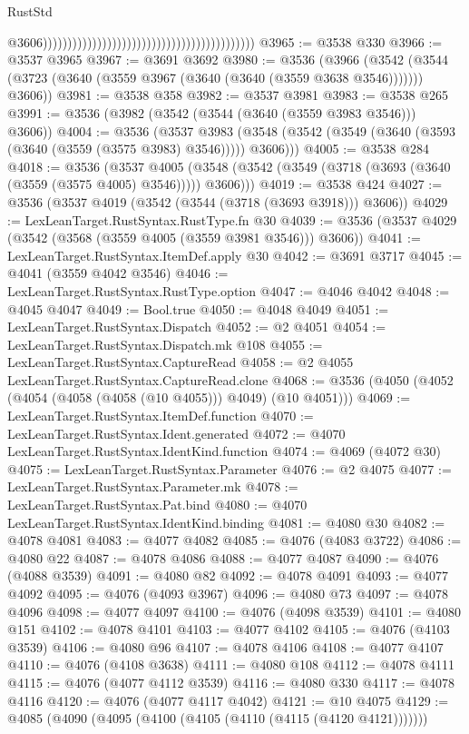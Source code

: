\begin{lexlean}{RustStd}
\begin{coremodule}
{\begin{coremodule}
{{{{{{{{{{{{{{{{{{{{{{{{{{{{{{{{{{{{{{{{{{{{{{{{{{                                                                                          @3606)))))))))))))))))))))))))))))))))))))))))))
@3965 := @3538 @330
@3966 := @3537 @3965
@3967 := @3691 @3692
@3980 := @3536
    (@3966 (@3542 (@3544 (@3723 (@3640 (@3559 @3967 (@3640 (@3640 (@3559 @3638 @3546))))))) @3606))
@3981 := @3538 @358
@3982 := @3537 @3981
@3983 := @3538 @265
@3991 := @3536 (@3982 (@3542 (@3544 (@3640 (@3559 @3983 @3546))) @3606))
@4004 := @3536
    (@3537 @3983 (@3548 (@3542 (@3549 (@3640 (@3593 (@3640 (@3559 (@3575 @3983) @3546))))) @3606)))
@4005 := @3538 @284
@4018 := @3536
    (@3537 @4005 (@3548 (@3542 (@3549 (@3718 (@3693 (@3640 (@3559 (@3575 @4005) @3546))))) @3606)))
@4019 := @3538 @424
@4027 := @3536 (@3537 @4019 (@3542 (@3544 (@3718 (@3693 @3918))) @3606))
@4029 := LexLeanTarget.RustSyntax.RustType.fn @30
@4039 := @3536 (@3537 @4029 (@3542 (@3568 (@3559 @4005 (@3559 @3981 @3546))) @3606))
@4041 := LexLeanTarget.RustSyntax.ItemDef.apply @30
@4042 := @3691 @3717
@4045 := @4041 (@3559 @4042 @3546)
@4046 := LexLeanTarget.RustSyntax.RustType.option
@4047 := @4046 @4042
@4048 := @4045 @4047
@4049 := Bool.true
@4050 := @4048 @4049
@4051 := LexLeanTarget.RustSyntax.Dispatch
@4052 := @2 @4051
@4054 := LexLeanTarget.RustSyntax.Dispatch.mk @108
@4055 := LexLeanTarget.RustSyntax.CaptureRead
@4058 := @2 @4055 LexLeanTarget.RustSyntax.CaptureRead.clone
@4068 := @3536 (@4050 (@4052 (@4054 (@4058 (@4058 (@10 @4055))) @4049) (@10 @4051)))
@4069 := LexLeanTarget.RustSyntax.ItemDef.function
@4070 := LexLeanTarget.RustSyntax.Ident.generated
@4072 := @4070 LexLeanTarget.RustSyntax.IdentKind.function
@4074 := @4069 (@4072 @30)
@4075 := LexLeanTarget.RustSyntax.Parameter
@4076 := @2 @4075
@4077 := LexLeanTarget.RustSyntax.Parameter.mk
@4078 := LexLeanTarget.RustSyntax.Pat.bind
@4080 := @4070 LexLeanTarget.RustSyntax.IdentKind.binding
@4081 := @4080 @30
@4082 := @4078 @4081
@4083 := @4077 @4082
@4085 := @4076 (@4083 @3722)
@4086 := @4080 @22
@4087 := @4078 @4086
@4088 := @4077 @4087
@4090 := @4076 (@4088 @3539)
@4091 := @4080 @82
@4092 := @4078 @4091
@4093 := @4077 @4092
@4095 := @4076 (@4093 @3967)
@4096 := @4080 @73
@4097 := @4078 @4096
@4098 := @4077 @4097
@4100 := @4076 (@4098 @3539)
@4101 := @4080 @151
@4102 := @4078 @4101
@4103 := @4077 @4102
@4105 := @4076 (@4103 @3539)
@4106 := @4080 @96
@4107 := @4078 @4106
@4108 := @4077 @4107
@4110 := @4076 (@4108 @3638)
@4111 := @4080 @108
@4112 := @4078 @4111
@4115 := @4076 (@4077 @4112 @3539)
@4116 := @4080 @330
@4117 := @4078 @4116
@4120 := @4076 (@4077 @4117 @4042)
@4121 := @10 @4075
@4129 := @4085 (@4090 (@4095 (@4100 (@4105 (@4110 (@4115 (@4120 @4121)))))))
}}}}}}}}}}}}}}}}}}}}}}}}}}}}}}}}}}}}}}}}}}}}}}}}}}
\end{coremodule}}
\end{coremodule}
\end{lexlean}
